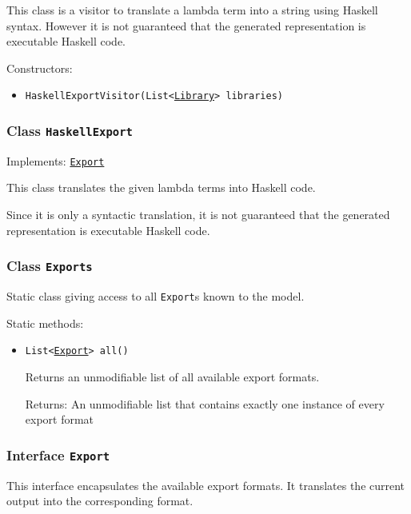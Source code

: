 This class is a visitor to translate a lambda term into a string using
 Haskell syntax. However it is not guaranteed that the generated
 representation is executable Haskell code.

Constructors:
\begin{itemize}
\item \texttt{HaskellExportVisitor(List<\hyperref[type:edu.kit.wavelength.client.model.library.Library]{Library}> libraries)}



\end{itemize}

\subsubsection{Class \texttt{HaskellExport}}
\label{type:edu.kit.wavelength.client.view.export.HaskellExport}
Implements: \texttt{\hyperref[type:edu.kit.wavelength.client.view.export.Export]{Export}}

This class translates the given lambda terms into Haskell code.
 
 Since it is only a syntactic translation, it is not guaranteed that the
 generated representation is executable Haskell code.

\subsubsection{Class \texttt{Exports}}
\label{type:edu.kit.wavelength.client.view.export.Exports}
Static class giving access to all \texttt{Export}s known to the model.

Static methods:
\begin{itemize}
\item \texttt{List<\hyperref[type:edu.kit.wavelength.client.view.export.Export]{Export}> all()}

Returns an unmodifiable list of all available export formats.

Returns: An unmodifiable list that contains exactly one instance of every
         export format

\end{itemize}

\subsubsection{Interface \texttt{Export}}
\label{type:edu.kit.wavelength.client.view.export.Export}
This interface encapsulates the available export formats. It translates the
 current output into the corresponding format.

